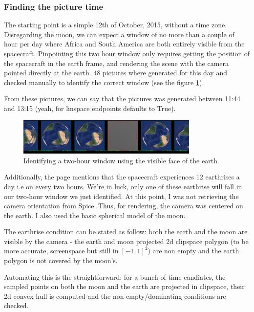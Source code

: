 \documentclass[14pt]{article}
\begin{document}
\subsubsection{Finding the picture time}

The starting point is a simple 12th of October, 2015, without a time zone. Disregarding the moon, we can expect a window of no more than a couple of hour per day where Africa and South America are both entirely visible from the spacecraft. Pinpointing this two hour window only requires getting the position of the spacecraft in the earth frame, and rendering the scene with the camera pointed directly at the earth.
48 pictures where generated for this day and checked manually to identify the correct window (see the figure \ref{img:lro_earth_rotation}).

From these pictures, we can say that the pictures was generated between 11:44 and 13:15 (yeah, for linspace endpoints defaults to True).

\begin{figure}[H]
  \centering
  \includegraphics[width=0.8\textwidth]{./data/lro_pinpoint_earth_rotation.png}
  \caption{Identifying a two-hour window using the visible face of the earth}
  \label{img:lro_earth_rotation}
\end{figure}


Additionally, the page mentions that the spacecraft experiences 12 earthrises a day i.e on every two hours. We're in luck, only one of these earthrise will fall in our two-hour window we just identified.
At this point, I was not retrieving the camera orientation from Spice. Thus, for rendering, the camera was centered on the earth. I also used the basic spherical model of the moon.

The earthrise condition can be stated as follow: both the earth and the moon are visible by the camera - the earth and moon projected 2d clipspace polygon (to be more accurate, screenspace but still in $[-1,1]^2$) are non empty and the earth polygon is not covered by the moon's.


Automating this is the straightforward: for a bunch of time candiates, the sampled points on both the moon and the earth are projected in clipspace, their 2d convex hull is computed and the non-empty/dominating conditions are checked.
\end{document}
